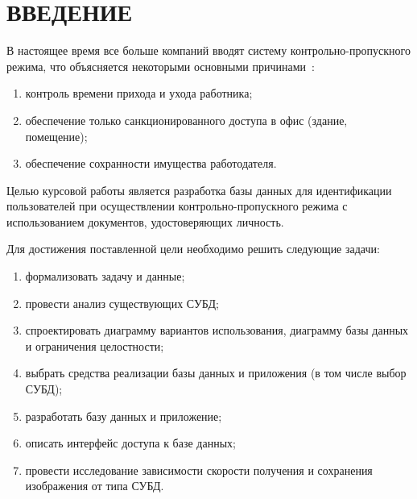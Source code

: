 \chapter*{ВВЕДЕНИЕ}

В настоящее время все больше компаний вводят систему контрольно-пропускного режима, что объясняется некоторыми основными причинами~\cite{introCPP}:
\begin{enumerate}
	\item контроль времени прихода и ухода работника;
	\item обеспечение только санкционированного доступа в офис (здание, помещение);
	\item обеспечение сохранности имущества работодателя.
\end{enumerate}

Целью курсовой работы является разработка базы данных для идентификации пользователей при осуществлении контрольно-пропускного режима с использованием документов, удостоверяющих личность.

Для достижения поставленной цели необходимо решить следующие задачи:
\begin{enumerate}
	\item формализовать задачу и данные;
	\item провести анализ существующих СУБД;
	\item спроектировать диаграмму вариантов использования, диаграмму базы данных и ограничения целостности;
	\item выбрать средства реализации базы данных и приложения (в том числе выбор СУБД);
	\item разработать базу данных и приложение;
	\item описать интерфейс доступа к базе данных;
	\item провести исследование зависимости скорости получения и сохранения изображения от типа СУБД.
\end{enumerate}